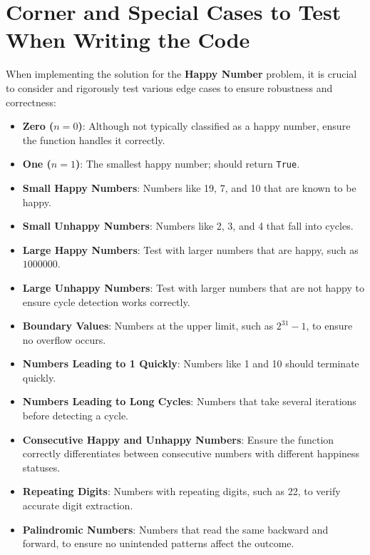 \section*{Corner and Special Cases to Test When Writing the Code}

When implementing the solution for the \textbf{Happy Number} problem, it is crucial to consider and rigorously test various edge cases to ensure robustness and correctness:

\begin{itemize}
    \item \textbf{Zero (\(n = 0\))}: Although not typically classified as a happy number, ensure the function handles it correctly.
    
    \item \textbf{One (\(n = 1\))}: The smallest happy number; should return \texttt{True}.
    
    \item \textbf{Small Happy Numbers}: Numbers like 19, 7, and 10 that are known to be happy.
    
    \item \textbf{Small Unhappy Numbers}: Numbers like 2, 3, and 4 that fall into cycles.
    
    \item \textbf{Large Happy Numbers}: Test with larger numbers that are happy, such as \(1000000\).
    
    \item \textbf{Large Unhappy Numbers}: Test with larger numbers that are not happy to ensure cycle detection works correctly.
    
    \item \textbf{Boundary Values}: Numbers at the upper limit, such as \(2^{31} - 1\), to ensure no overflow occurs.
    
    \item \textbf{Numbers Leading to 1 Quickly}: Numbers like 1 and 10 should terminate quickly.
    
    \item \textbf{Numbers Leading to Long Cycles}: Numbers that take several iterations before detecting a cycle.
    
    \item \textbf{Consecutive Happy and Unhappy Numbers}: Ensure the function correctly differentiates between consecutive numbers with different happiness statuses.
    
    \item \textbf{Repeating Digits}: Numbers with repeating digits, such as 22, to verify accurate digit extraction.
    
    \item \textbf{Palindromic Numbers}: Numbers that read the same backward and forward, to ensure no unintended patterns affect the outcome.
\end{itemize}

